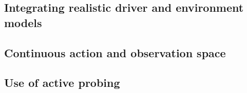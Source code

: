 \subsection{Integrating realistic driver and environment models}
\subsection{Continuous action and observation space}
\label{sec:conclusion-continuous}





\subsection{Use of active probing}


